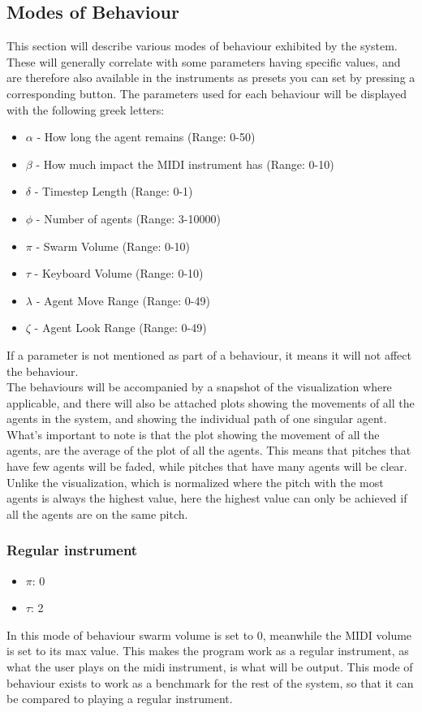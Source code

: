 \documentclass[a4paper,english]{report}
\begin{document}
	\subsection{Modes of Behaviour}
	This section will describe various modes of behaviour exhibited by the system. These will generally correlate with some parameters having specific values, and are therefore also available in the instruments as presets you can set by pressing a corresponding button. The parameters used for each behaviour will be displayed with the following greek letters:
	\begin{samepage}\begin{itemize}
		\item $\alpha$ - How long the agent remains (Range: 0-50)
		\item $\beta$ - How much impact the MIDI instrument has (Range: 0-10)
		\item $\delta$ - Timestep Length (Range: 0-1)
		\item $\phi$ - Number of agents (Range: 3-10000)
		\item $\pi$ - Swarm Volume (Range: 0-10)
		\item $\tau$ - Keyboard Volume (Range: 0-10)
		\item $\lambda$ - Agent Move Range (Range: 0-49)
		\item $\zeta$ - Agent Look Range (Range: 0-49)
	\end{itemize}\end{samepage}
	If a parameter is not mentioned as part of a behaviour, it means it will not affect the behaviour.\\
	The behaviours will be accompanied by a snapshot of the visualization where applicable, and there will also be attached plots showing the movements of all the agents in the system, and showing the individual path of one singular agent. What's important to note is that the plot showing the movement of all the agents, are the average of the plot of all the agents. This means that pitches that have few agents will be faded, while pitches that have many agents will be clear. Unlike the visualization, which is normalized where the pitch with the most agents is always the highest value, here the highest value can only be achieved if all the agents are on the same pitch.
	
	\subsubsection{Regular instrument}
	\begin{samepage}\begin{itemize}
		\item $\pi$: 0
		\item $\tau$: 2
	\end{itemize}\end{samepage}
	In this mode of behaviour swarm volume is set to 0, meanwhile the MIDI volume is set to its max value. This makes the program work as a regular instrument, as what the user plays on the midi instrument, is what will be output. This mode of behaviour exists to work as a benchmark for the rest of the system, so that it can be compared to playing a regular instrument.
	
\end{document}
